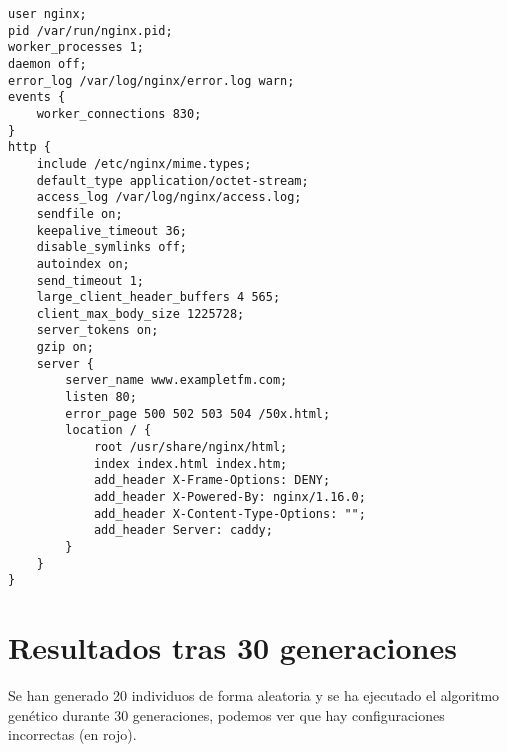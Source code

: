 \begin{lstlisting}[label={lst:nginx_config_random},caption={Configuración de NGINX tras 2 generaciones}]
user nginx;
pid /var/run/nginx.pid;
worker_processes 1;
daemon off;
error_log /var/log/nginx/error.log warn;
events {
    worker_connections 830;
}
http {
    include /etc/nginx/mime.types;
    default_type application/octet-stream;
    access_log /var/log/nginx/access.log;
    sendfile on;
    keepalive_timeout 36;
    disable_symlinks off;
    autoindex on;
    send_timeout 1;
    large_client_header_buffers 4 565;
    client_max_body_size 1225728;
    server_tokens on;
    gzip on;
    server {
        server_name www.exampletfm.com;
        listen 80;
        error_page 500 502 503 504 /50x.html;
        location / {
            root /usr/share/nginx/html;
            index index.html index.htm;
            add_header X-Frame-Options: DENY;
            add_header X-Powered-By: nginx/1.16.0;
            add_header X-Content-Type-Options: "";
            add_header Server: caddy;
        }
    }
}
\end{lstlisting}

\section{Resultados tras 30 generaciones}

Se han generado 20 individuos de forma aleatoria y se ha ejecutado el algoritmo genético durante 30 generaciones, podemos ver que hay configuraciones incorrectas (en rojo).

